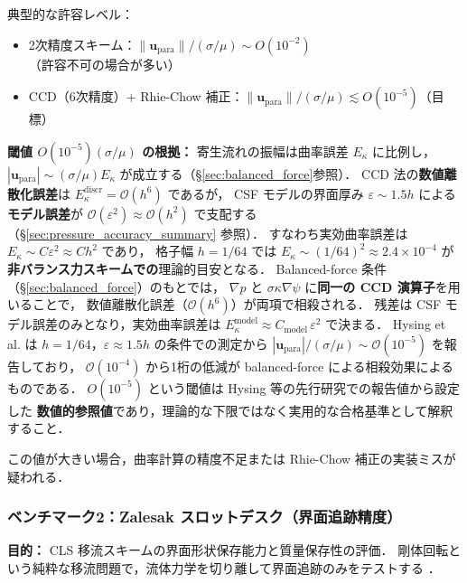 \begin{tcolorbox}[warnbox, title={寄生流れ振幅の目安と閾値の根拠}]
典型的な許容レベル：
\begin{itemize}
  \item 2次精度スキーム：$\|\bm{u}_{\text{para}}\| / ({\sigma/\mu}) \sim O(10^{-2})$（許容不可の場合が多い）
  \item CCD（6次精度）+ Rhie-Chow 補正：$\|\bm{u}_{\text{para}}\| / ({\sigma/\mu}) \lesssim O(10^{-5})$（目標）
\end{itemize}

\textbf{閾値 $O(10^{-5})(\sigma/\mu)$ の根拠：}
寄生流れの振幅は曲率誤差 $E_\kappa$ に比例し，$|\bm{u}_\text{para}| \sim (\sigma/\mu) E_\kappa$ が成立する（§\ref{sec:balanced_force}参照）．
CCD 法の\textbf{数値離散化誤差}は $E_\kappa^{\text{discr}} = \mathcal{O}(h^6)$ であるが，
CSF モデルの界面厚み $\varepsilon \sim 1.5h$ による\textbf{モデル誤差}が $\mathcal{O}(\varepsilon^2)\approx\mathcal{O}(h^2)$ で支配する
（§\ref{sec:pressure_accuracy_summary} 参照）．
すなわち実効曲率誤差は $E_\kappa \sim C\varepsilon^2 \approx C h^2$ であり，
格子幅 $h = 1/64$ では $E_\kappa \sim (1/64)^2 \approx 2.4\times10^{-4}$ が\textbf{非バランス力スキームでの}理論的目安となる．
Balanced-force 条件（§\ref{sec:balanced_force}）のもとでは，
$\nabla p$ と $\sigma\kappa\nabla\psi$ に\textbf{同一の CCD 演算子}を用いることで，
数値離散化誤差（$\mathcal{O}(h^6)$）が両項で相殺される．
残差は CSF モデル誤差のみとなり，実効曲率誤差は $E_\kappa^{\text{model}} \approx C_{\text{model}}\,\varepsilon^2$ で決まる．
Hysing et al. \cite{Hysing2009} は $h = 1/64$，$\varepsilon \approx 1.5h$ の条件での測定から
$|\bm{u}_\text{para}|/(\sigma/\mu) \sim \mathcal{O}(10^{-5})$ を報告しており，
$\mathcal{O}(10^{-4})$ から1桁の低減が balanced-force による相殺効果によるものである．
$O(10^{-5})$ という閾値は Hysing 等の先行研究での報告値から設定した
\textbf{数値的参照値}であり，理論的な下限ではなく実用的な合格基準として解釈すること．

この値が大きい場合，曲率計算の精度不足または Rhie-Chow 補正の実装ミスが疑われる．
\end{tcolorbox}

\subsubsection{ベンチマーク2：Zalesak スロットデスク（界面追跡精度）}
\label{sec:bench_zalesak}

\textbf{目的：} CLS 移流スキームの界面形状保存能力と質量保存性の評価．
剛体回転という純粋な移流問題で，流体力学を切り離して界面追跡のみをテストする \cite{Zalesak1979}．


